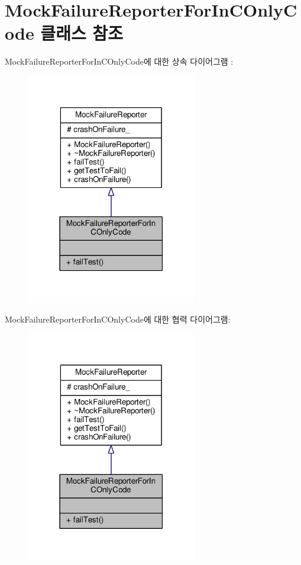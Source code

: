 \hypertarget{class_mock_failure_reporter_for_in_c_only_code}{}\section{Mock\+Failure\+Reporter\+For\+In\+C\+Only\+Code 클래스 참조}
\label{class_mock_failure_reporter_for_in_c_only_code}


Mock\+Failure\+Reporter\+For\+In\+C\+Only\+Code에 대한 상속 다이어그램 \+: 
\nopagebreak
\begin{figure}[H]
\begin{center}
\leavevmode
\includegraphics[width=210pt]{class_mock_failure_reporter_for_in_c_only_code__inherit__graph}
\end{center}
\end{figure}


Mock\+Failure\+Reporter\+For\+In\+C\+Only\+Code에 대한 협력 다이어그램\+:
\nopagebreak
\begin{figure}[H]
\begin{center}
\leavevmode
\includegraphics[width=210pt]{class_mock_failure_reporter_for_in_c_only_code__coll__graph}
\end{center}
\end{figure}
